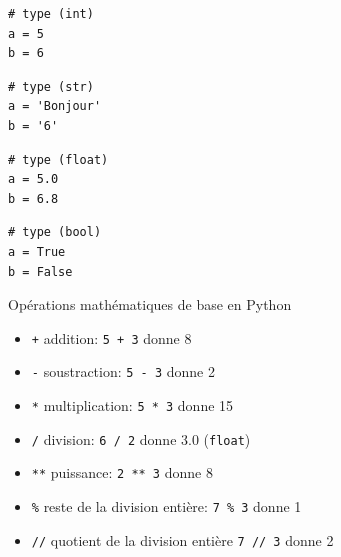 \begin{minipage}{0.19\linewidth}
\begin{lstlisting}[numbers=none]
# type (int)
a = 5
b = 6
\end{lstlisting}
    \end{minipage}\hfill
    \begin{minipage}{0.19\linewidth}    
\begin{lstlisting}[numbers=none]   
# type (str)
a = 'Bonjour'
b = '6'   
\end{lstlisting}    
    \end{minipage}\hfill
    \begin{minipage}{0.19\linewidth}    
\begin{lstlisting}[numbers=none] 
# type (float)
a = 5.0 
b = 6.8
\end{lstlisting}    
    \end{minipage}\hfill{}
\begin{minipage}{0.19\linewidth}    
\begin{lstlisting}[numbers=none]  
# type (bool)
a = True
b = False
\end{lstlisting}    
    \end{minipage}

\begin{easybox}{Opérations mathématiques de base en Python}{}
	\begin{minipage}{0.43\linewidth}
		\begin{itemize}[]
        \item[] \texttt{+} \quad  addition:  \verb~5 + 3~ donne 8
        \item[] \texttt{-} \quad  soustraction: \verb~5 - 3~ donne 2
        \item[] \texttt{*} \quad  multiplication: \verb~5 * 3~ donne 15
        \item[] \texttt{/} \quad  division: \verb~6 / 2~ donne 3.0 (\texttt{float})
\end{itemize}
	\end{minipage}\hfill{}
	\begin{minipage}{0.55\linewidth}
\begin{itemize}[]
        \item[] \texttt{**} \quad  puissance: \verb~2 ** 3~ donne 8
        \item[] \texttt{\%} \quad  reste de la division entière: \texttt{7 \% 3} donne 1
        \item[] \texttt{//} \quad  quotient de la division entière \texttt{7 // 3} donne 2
    \end{itemize}
	\end{minipage}
\end{easybox}

